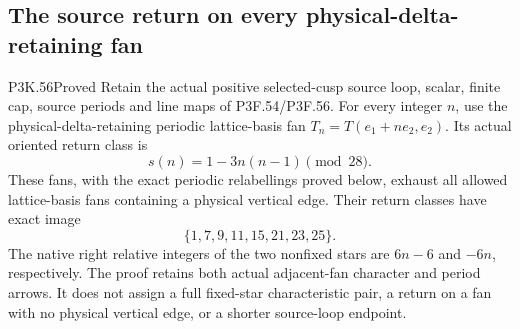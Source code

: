 \subsection{The source return on every physical-delta-retaining fan}
\begin{statement}{P3K.56}{Proved}
Retain the actual positive selected-cusp source loop, scalar, finite
cap, source periods and line maps of P3F.54/P3F.56. For every integer
\(n\), use the physical-delta-retaining periodic lattice-basis fan
\(T_n=T(e_1+ne_2,e_2)\). Its actual oriented return class is
\[
                  s(n)=1-3n(n-1)\pmod{28}.
\]
These fans, with the exact periodic relabellings proved below,
exhaust all allowed lattice-basis fans containing a physical vertical
edge. Their return classes have exact image
\[
                     \{1,7,9,11,15,21,23,25\}.
\]
The native right relative integers of the two nonfixed stars are
\(6n-6\) and \(-6n\), respectively. The proof retains both actual
adjacent-fan character and period arrows. It does not assign a full
fixed-star characteristic pair, a return on a fan with no physical
vertical edge, or a shorter source-loop endpoint.
\end{statement}
